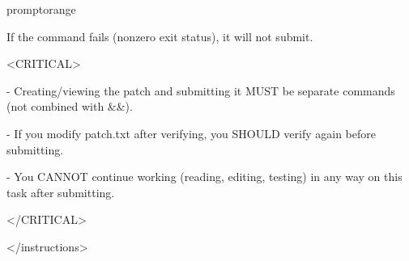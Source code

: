 \documentclass{llmxive}
\begin{document}
\begin{promptbox}{promptorange}
{\textasciigrave{}\textasciigrave{}\textasciigrave{}\par
\vspace{0.35em}\par
If the command fails (nonzero exit status), it will not submit.\par
\vspace{0.35em}\par
\textless{}CRITICAL\textgreater{}\par
- Creating/viewing the patch and submitting it MUST be separate commands (not combined with \&\&).\par
- If you modify patch.txt after verifying, you SHOULD verify again before submitting.\par
- You CANNOT continue working (reading, editing, testing) in any way on this task after submitting.\par
\textless{}/CRITICAL\textgreater{}\par
\textless{}/instructions\textgreater{}\par
}
\end{promptbox}
\end{document}
